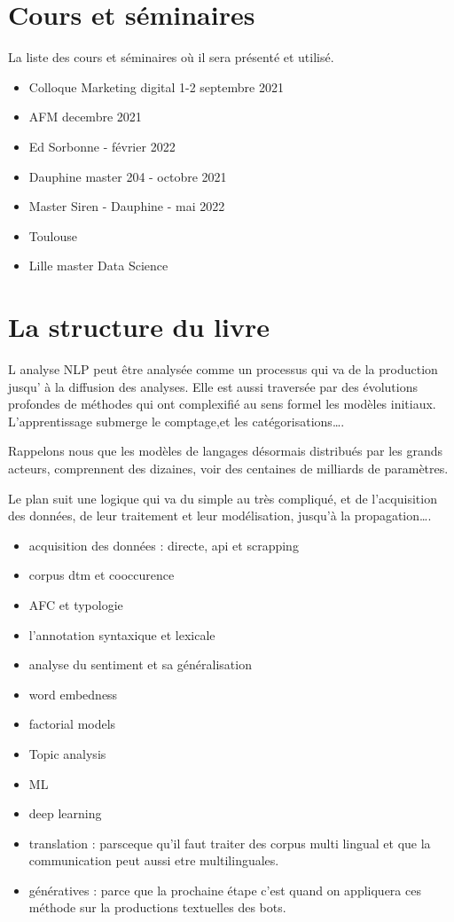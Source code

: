 \documentclass[
]{book}
\providecommand{\tightlist}{%
  \setlength{\itemsep}{0pt}\setlength{\parskip}{0pt}}
\begin{document}
\hypertarget{cours-et-suxe9minaires}{%
\section{Cours et séminaires}\label{cours-et-suxe9minaires}}

La liste des cours et séminaires où il sera présenté et utilisé.

\begin{itemize}
\tightlist
\item
  Colloque Marketing digital 1-2 septembre 2021
\item
  AFM decembre 2021
\item
  Ed Sorbonne - février 2022
\item
  Dauphine master 204 - octobre 2021
\item
  Master Siren - Dauphine - mai 2022
\item
  Toulouse
\item
  Lille master Data Science
\end{itemize}

\hypertarget{la-structure-du-livre}{%
\section{La structure du livre}\label{la-structure-du-livre}}

L analyse NLP peut être analysée comme un processus qui va de la production jusqu' à la diffusion des analyses. Elle est aussi traversée par des évolutions profondes de méthodes qui ont complexifié au sens formel les modèles initiaux. L'apprentissage submerge le comptage,et les catégorisations\ldots.

Rappelons nous que les modèles de langages désormais distribués par les grands acteurs, comprennent des dizaines, voir des centaines de milliards de paramètres.

Le plan suit une logique qui va du simple au très compliqué, et de l'acquisition des données, de leur traitement et leur modélisation, jusqu'à la propagation\ldots.

\begin{itemize}
\tightlist
\item
  acquisition des données : directe, api et scrapping
\item
  corpus dtm et cooccurence
\item
  AFC et typologie
\item
  l'annotation syntaxique et lexicale
\item
  analyse du sentiment et sa généralisation
\item
  word embedness
\item
  factorial models
\item
  Topic analysis
\item
  ML
\item
  deep learning
\item
  translation : parsceque qu'il faut traiter des corpus multi lingual et que la communication peut aussi etre multilinguales.
\item
  génératives : parce que la prochaine étape c'est quand on appliquera ces méthode sur la productions textuelles des bots.
\end{itemize}
\end{document}
